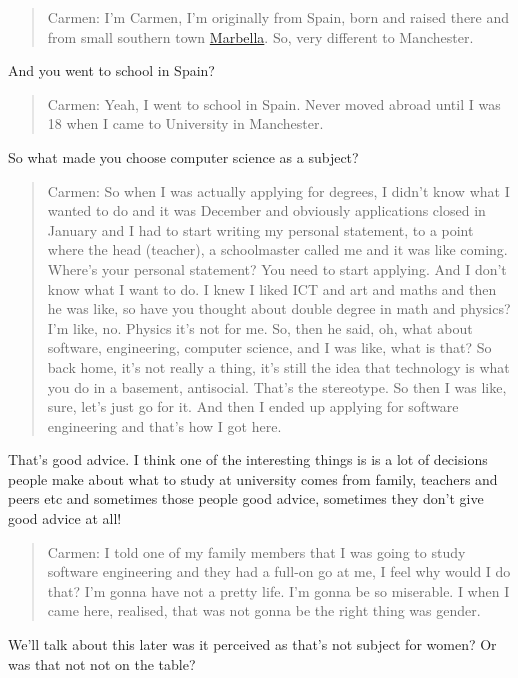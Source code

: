 \documentclass[
]{book}
\begin{document}
\begin{quote}
Carmen: I'm Carmen, I'm originally from Spain, born and raised there and from small southern town \href{https://en.wikipedia.org/wiki/Marbella}{Marbella}. So, very different to Manchester.
\end{quote}

And you went to school in Spain?

\begin{quote}
Carmen: Yeah, I went to school in Spain. Never moved abroad until I was 18 when I came to University in Manchester.
\end{quote}

So what made you choose computer science as a subject?

\begin{quote}
Carmen: So when I was actually applying for degrees, I didn't know what I wanted to do and it was December and obviously applications closed in January and I had to start writing my personal statement, to a point where the head (teacher), a schoolmaster called me and it was like coming. Where's your personal statement? You need to start applying. And I don't know what I want to do. I knew I liked ICT and art and maths and then he was like, so have you thought about double degree in math and physics? I'm like, no. Physics it's not for me. So, then he said, oh, what about software, engineering, computer science, and I was like, what is that? So back home, it's not really a thing, it's still the idea that technology is what you do in a basement, antisocial. That's the stereotype. So then I was like, sure, let's just go for it. And then I ended up applying for software engineering and that's how I got here.
\end{quote}

That's good advice. I think one of the interesting things is is a lot of decisions people make about what to study at university comes from family, teachers and peers etc and sometimes those people good advice, sometimes they don't give good advice at all!

\begin{quote}
Carmen: I told one of my family members that I was going to study software engineering and they had a full-on go at me, I feel why would I do that? I'm gonna have not a pretty life. I'm gonna be so miserable. I when I came here, realised, that was not gonna be the right thing was gender.
\end{quote}

We'll talk about this later was it perceived as that's not subject for women? Or was that not not on the table?
\end{document}
